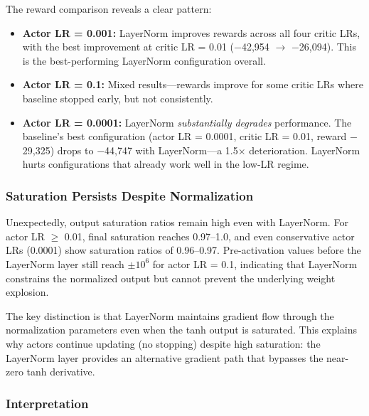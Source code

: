 The reward comparison reveals a clear pattern:
\begin{itemize}
    \item \textbf{Actor LR = 0.001:} LayerNorm improves rewards across all four critic LRs, with the best improvement at critic LR = 0.01 ($-$42,954 $\rightarrow$ $-$26,094). This is the best-performing LayerNorm configuration overall.

    \item \textbf{Actor LR = 0.1:} Mixed results---rewards improve for some critic LRs where baseline stopped early, but not consistently.

    \item \textbf{Actor LR = 0.0001:} LayerNorm \textit{substantially degrades} performance. The baseline's best configuration (actor LR = 0.0001, critic LR = 0.01, reward $-$29,325) drops to $-$44,747 with LayerNorm---a 1.5$\times$ deterioration. LayerNorm hurts configurations that already work well in the low-LR regime.
\end{itemize}

\subsubsection{Saturation Persists Despite Normalization}

Unexpectedly, output saturation ratios remain high even with LayerNorm. For actor LR $\geq$ 0.01, final saturation reaches 0.97--1.0, and even conservative actor LRs (0.0001) show saturation ratios of 0.96--0.97. Pre-activation values before the LayerNorm layer still reach $\pm 10^6$ for actor LR = 0.1, indicating that LayerNorm constrains the normalized output but cannot prevent the underlying weight explosion.

The key distinction is that LayerNorm maintains gradient flow through the normalization parameters even when the tanh output is saturated. This explains why actors continue updating (no stopping) despite high saturation: the LayerNorm layer provides an alternative gradient path that bypasses the near-zero tanh derivative.

\subsubsection{Interpretation}

